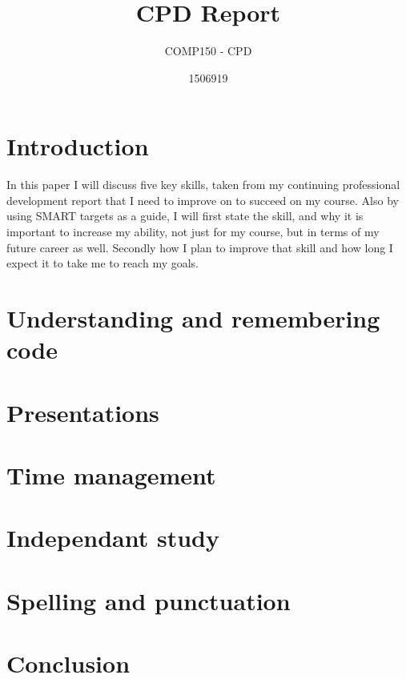 \documentclass{scrartcl}
\title{CPD Report}
\subtitle{COMP150 - CPD}
\author{1506919}
\begin{document}
\maketitle

\section{Introduction}

In this paper I will discuss five key skills, taken from my continuing professional development report that I need to improve on to succeed on my course. Also by using SMART targets as a guide, I will first state the skill, and why it is important to increase my ability, not just for my course, but in terms of my future career as well. Secondly how I plan to improve that skill and how long I expect it to take me to reach my goals.

\section {Understanding and remembering code}


\section {Presentations}


\section{Time management}


\section{Independant study}


\section{Spelling and punctuation}


\section{Conclusion}
\end{document}
